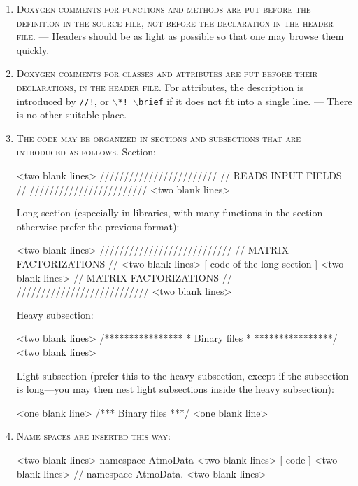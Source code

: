 \documentclass{tufte-book}
\newcounter{points}
\newcommand{\code}[1]{\texttt{#1}}
\renewcommand{\rule}[1]{\textsc{#1}}
\newcommand{\commentcs}[1]{\newline #1}
\newcommand{\commentf}[1]{#1}
\newcommand{\justification}[1]{\newline {\it Justification} --- #1}
\newcommand{\njustification}[1]{{\it Justification} --- #1}
\newenvironment{cenumerate}
{
  \begin{enumerate}\setcounter{enumi}{\value{points}}%
  }
  {
    \setcounter{points}{\value{enumi}}\end{enumerate}
}
\begin{document}
\begin{cenumerate}
\begin{frame_cpp}
  \return The sign of \a value.
*/
\end{frame_cpp}
  \njustification{These rules ensure that the Doxygen documentation is
    complete and clean.}
\item \rule{Doxygen comments for functions and methods are put before the
    definition in the source file, not before the declaration in the header
    file.} \justification{Headers should be as light as possible so that one
    may browse them quickly.}
\item \rule{Doxygen comments for classes and attributes are put before their
    declarations, in the header file.} \commentcs{For attributes, the
    description is introduced by {\rm \code{//!}}, or {\rm
      \code{$\backslash$*! $\backslash$brief}} if it does not fit into a
    single line.} \justification{There is no other suitable place.}
\item \rule{The code may be organized in sections and subsections that are
    introduced as follows.}  \commentcs{Section:}
\begin{frame_cpp}
  <two blank lines>
  ////////////////////////
  // READS INPUT FIELDS //
  ////////////////////////
  <two blank lines>
\end{frame_cpp}
  \commentf{Long section (especially in libraries, with many functions in the
    section---otherwise prefer the previous format):}
\begin{frame_cpp}
  <two blank lines>
  ///////////////////////////
  // MATRIX FACTORIZATIONS //
  <two blank lines>
  [ code of the long section ]
  <two blank lines>
  // MATRIX FACTORIZATIONS //
  ///////////////////////////
  <two blank lines>
\end{frame_cpp}
\commentf{Heavy subsection:}
\begin{frame_cpp}
  <two blank lines>
  /****************
   * Binary files *
   ****************/
  <two blank lines>
\end{frame_cpp}
\commentf{Light subsection (prefer this to the heavy subsection, except if the
  subsection is long---you may then nest light subsections inside the heavy
  subsection):}
\begin{frame_cpp}
  <one blank line>
  /*** Binary files ***/
  <one blank line>
\end{frame_cpp}
\item \rule{Name spaces are inserted this way:}
\begin{frame_cpp}
<two blank lines>
namespace AtmoData
{
<two blank lines>
    [ code ]
<two blank lines>
} // namespace AtmoData.
<two blank lines>
\end{frame_cpp}
\end{cenumerate}
\end{document}

